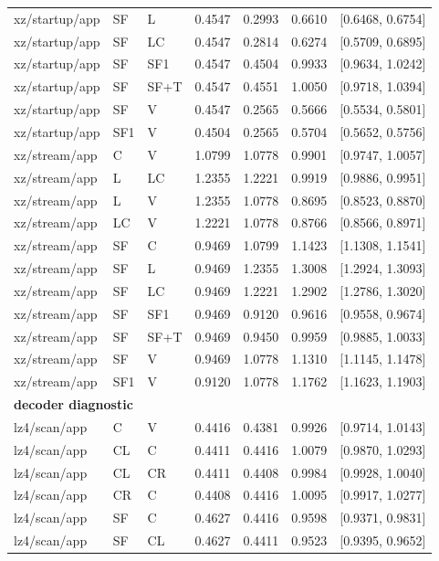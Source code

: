 \begin{longtable}{lllrrrr}
xz/startup/app & SF & L & 0.4547 & 0.2993 & 0.6610 & [0.6468, 0.6754] \\
xz/startup/app & SF & LC & 0.4547 & 0.2814 & 0.6274 & [0.5709, 0.6895] \\
xz/startup/app & SF & SF1 & 0.4547 & 0.4504 & 0.9933 & [0.9634, 1.0242] \\
xz/startup/app & SF & SF+T & 0.4547 & 0.4551 & 1.0050 & [0.9718, 1.0394] \\
xz/startup/app & SF & V & 0.4547 & 0.2565 & 0.5666 & [0.5534, 0.5801] \\
xz/startup/app & SF1 & V & 0.4504 & 0.2565 & 0.5704 & [0.5652, 0.5756] \\
xz/stream/app & C & V & 1.0799 & 1.0778 & 0.9901 & [0.9747, 1.0057] \\
xz/stream/app & L & LC & 1.2355 & 1.2221 & 0.9919 & [0.9886, 0.9951] \\
xz/stream/app & L & V & 1.2355 & 1.0778 & 0.8695 & [0.8523, 0.8870] \\
xz/stream/app & LC & V & 1.2221 & 1.0778 & 0.8766 & [0.8566, 0.8971] \\
xz/stream/app & SF & C & 0.9469 & 1.0799 & 1.1423 & [1.1308, 1.1541] \\
xz/stream/app & SF & L & 0.9469 & 1.2355 & 1.3008 & [1.2924, 1.3093] \\
xz/stream/app & SF & LC & 0.9469 & 1.2221 & 1.2902 & [1.2786, 1.3020] \\
xz/stream/app & SF & SF1 & 0.9469 & 0.9120 & 0.9616 & [0.9558, 0.9674] \\
xz/stream/app & SF & SF+T & 0.9469 & 0.9450 & 0.9959 & [0.9885, 1.0033] \\
xz/stream/app & SF & V & 0.9469 & 1.0778 & 1.1310 & [1.1145, 1.1478] \\
xz/stream/app & SF1 & V & 0.9120 & 1.0778 & 1.1762 & [1.1623, 1.1903] \\
\multicolumn{7}{l}{\textbf{decoder diagnostic}} \\
lz4/scan/app & C & V & 0.4416 & 0.4381 & 0.9926 & [0.9714, 1.0143] \\
lz4/scan/app & CL & C & 0.4411 & 0.4416 & 1.0079 & [0.9870, 1.0293] \\
lz4/scan/app & CL & CR & 0.4411 & 0.4408 & 0.9984 & [0.9928, 1.0040] \\
lz4/scan/app & CR & C & 0.4408 & 0.4416 & 1.0095 & [0.9917, 1.0277] \\
lz4/scan/app & SF & C & 0.4627 & 0.4416 & 0.9598 & [0.9371, 0.9831] \\
lz4/scan/app & SF & CL & 0.4627 & 0.4411 & 0.9523 & [0.9395, 0.9652] \\

\end{longtable}
